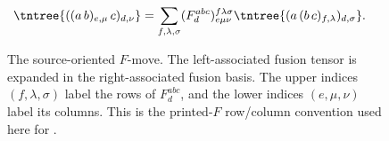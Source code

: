\begin{figure}[ht]
    \centering
    \begin{align}
        \tntree{((a\,b)_{e,\mu}\,c)_{d,\nu}}
         & =
        \sum_{f,\lambda,\sigma}
        (F^{abc}_{d})^{f\lambda\sigma}_{e\mu\nu}
        \tntree{(a\,(b\,c)_{f,\lambda})_{d,\sigma}}. \notag
    \end{align}
    \caption{The source-oriented $F$-move. The left-associated fusion tensor
        is expanded in the right-associated fusion basis. The upper indices
        $(f,\lambda,\sigma)$ label the rows of $F^{abc}_d$, and the lower
        indices $(e,\mu,\nu)$ label its columns. This is the printed-$F$
        row/column convention used here for
        \cite[Section~3.4]{Bultinck2017Anyons}.}
    \label{fig:mpdo_complete_zipper_printed_fmove}
\end{figure}

